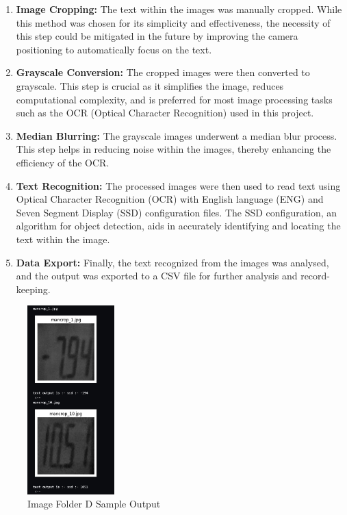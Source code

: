 \begin{enumerate}
    \item \textbf{Image Cropping:} The text within the images was manually cropped. While this method was chosen for its simplicity and effectiveness, the necessity of this step could be mitigated in the future by improving the camera positioning to automatically focus on the text.

    \item \textbf{Grayscale Conversion:} The cropped images were then converted to grayscale. This step is crucial as it simplifies the image, reduces computational complexity, and is preferred for most image processing tasks such as the OCR (Optical Character Recognition) used in this project.

    \item \textbf{Median Blurring:} The grayscale images underwent a median blur process. This step helps in reducing noise within the images, thereby enhancing the efficiency of the OCR.

    \item \textbf{Text Recognition:} The processed images were then used to read text using Optical Character Recognition (OCR) with English language (ENG) and Seven Segment Display (SSD) configuration files. The SSD configuration, an algorithm for object detection, aids in accurately identifying and locating the text within the image.

    \item \textbf{Data Export:} Finally, the text recognized from the images was analysed, and the output was exported to a CSV file for further analysis and record-keeping.
\end{enumerate}

\begin{figure}[ht]
    \centering
    \includegraphics[width=0.3\textwidth]{Figures/Methodology/sipa_05/sample_output.jpg}
    \caption[Image Folder D Sample Output]{Image Folder D Sample Output}
    \label{fig:Image Folder D Sample Output}
\end{figure}

